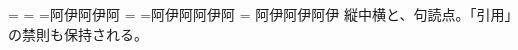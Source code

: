 \documentclass[pdflatex,tate,paper=a5]{jlreq}
\begin{document}
\newbox\tcybox
\setbox\tcybox=\hbox{}%
\ifdim\wd\tcybox=\dimexpr1\ptj@zwreg\relax
  \typeout{TATE-PASS: TCY-GT (wd=\the\wd\tcybox)}%
\else
  \typeout{TATE-FAIL: TCY-GT (wd=\the\wd\tcybox)}%
\fi
\setbox\tcybox=\hbox{}%
\ifdim\wd\tcybox=\dimexpr1\ptj@zwreg\relax
  \typeout{TATE-PASS: TCY-BF (wd=\the\wd\tcybox)}%
\else
  \typeout{TATE-FAIL: TCY-BF (wd=\the\wd\tcybox)}%
\fi
\newdimen\lenwithtcy \newdimen\lenplain
\setbox\tcybox=\hbox{阿伊阿伊阿}%
\lenwithtcy=\wd\tcybox
\setbox\tcybox=\hbox{阿伊阿阿伊阿}%
\lenplain=\wd\tcybox
\ifdim\dimexpr\lenwithtcy-\lenplain\relax<0.5pt\relax
  \ifdim\dimexpr\lenplain-\lenwithtcy\relax<0.5pt\relax
    \typeout{TATE-PASS: TCY-BOUNDARY (delta=\the\dimexpr\lenwithtcy-\lenplain\relax)}%
  \else
    \typeout{TATE-FAIL: TCY-BOUNDARY (delta=\the\dimexpr\lenwithtcy-\lenplain\relax)}%
  \fi
\else
\fi
阿伊阿伊阿伊
縦中横と、句読点。「引用」の禁則も保持される。
\end{document}
